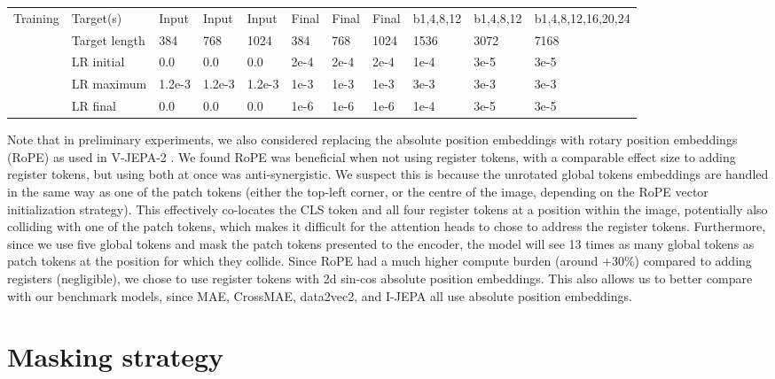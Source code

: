 \begin{table}[tbh]
{\begin{tabular}{@{}lllllllllll@{}}
Training  & Target(s)         & Input    & Input    & Input      & Final    & Final    & Final     & b1,4,8,12& b1,4,8,12& b1,4,8,12,16,20,24 \\
          & Target length     & 384      & 768      & 1024       & 384      & 768      & 1024      & 1536     & 3072     & 7168      \\
          & LR initial        & 0.0      & 0.0      & 0.0        & 2e-4     & 2e-4     & 2e-4      & 1e-4     & 3e-5     & 3e-5      \\
          & LR maximum        & 1.2e-3   & 1.2e-3   & 1.2e-3     & 1e-3     & 1e-3     & 1e-3      & 3e-3     & 3e-3     & 3e-3      \\
          & LR final          & 0.0      & 0.0      & 0.0        & 1e-6     & 1e-6     & 1e-6      & 1e-4     & 3e-5     & 3e-5      \\
\bottomrule
\end{tabular}
}
\end{table}

Note that in preliminary experiments, we also considered replacing the absolute position embeddings with rotary position embeddings (RoPE) \citep{Su2024rope} as used in V-JEPA-2 \citep{assran2025vjepa2}.
We found RoPE was beneficial when not using register tokens, with a comparable effect size to adding register tokens, but using both at once was anti-synergistic.
We suspect this is because the unrotated global tokens embeddings are handled in the same way as one of the patch tokens (either the top-left corner, or the centre of the image, depending on the RoPE vector initialization strategy).
This effectively co-locates the CLS token and all four register tokens at a position within the image, potentially also colliding with one of the patch tokens, which makes it difficult for the attention heads to chose to address the register tokens.
Furthermore, since we use five global tokens and mask the patch tokens presented to the encoder, the model will see 13 times as many global tokens as patch tokens at the position for which they collide.
Since RoPE had a much higher compute burden (around +30\%) compared to adding registers (negligible), we chose to use register tokens with 2d sin-cos absolute position embeddings.
This also allows us to better compare with our benchmark models, since MAE, CrossMAE, data2vec2, and I-JEPA all use absolute position embeddings.

\FloatBarrier
\section{Masking strategy}
\label{s:masking-implementation-improvements}

